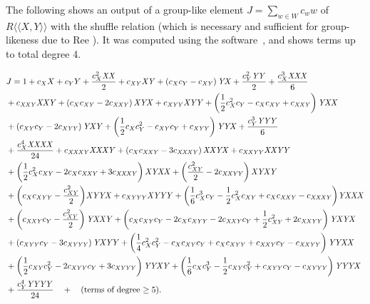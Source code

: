 \documentclass[ALCO,Unicode,published]{cedram}
\def\la{\langle}
\def\ra{\rangle}
\def\lala{\la\!\la}
\def\rara{\ra\!\ra}
\begin{document}
\begin{Example}
The following shows an output of a group-like element 
$J=\sum_{w\in W}c_w w$ of $R\lala X,Y\rara$ with the
shuffle relation (which is necessary and 
sufficient for group-likeness due to Ree \cite{Ree}). 
It was computed using the software~\cite{Maple}, and shows terms
up to total degree 4.

\footnotesize \begin{align*} 
\displaystyle &J=
1+c_{X} X +c_{Y} Y +\frac{c_{X}^{2} \mathit{XX}}{2}+c_{\mathit{XY}} \mathit{XY} +\left(c_{X} c_{Y}-c_{\mathit{XY}}\right) \mathit{YX} 
+\frac{c_{Y}^{2} \mathit{YY}}{2}+\frac{c_{X}^{3} \mathit{XXX}}{6} 
\\
&+c_{\mathit{XXY}} \mathit{XXY} +\left(c_{X} c_{\mathit{XY}}-2 c_{\mathit{XXY}}\right) \mathit{XYX} +c_{\mathit{XYY}} \mathit{XYY} +\left(\frac{1}{2} c_{X}^{2} c_{Y}-c_{X} c_{\mathit{XY}}+c_{\mathit{XXY}}\right) \mathit{YXX} 
\\
&+\left(c_{\mathit{XY}} c_{Y}-2 c_{\mathit{XYY}}\right) \mathit{YXY} 
+\left(\frac{1}{2} c_{X} c_{Y}^{2}-c_{\mathit{XY}} c_{Y}+c_{\mathit{XYY}}\right) \mathit{YYX} +\frac{c_{Y}^{3} \mathit{YYY}}{6}
\\
&+\frac{c_{X}^{4} \mathit{XXXX}}{24}+c_{\mathit{XXXY}} \mathit{XXXY} +\left(c_{X} c_{\mathit{XXY}}-3 c_{\mathit{XXXY}}\right) \mathit{XXYX} +c_{\mathit{XXYY}} \mathit{XXYY} 
\\
&+\left(\frac{1}{2} c_{X}^{2} c_{\mathit{XY}}-2 c_{X} c_{\mathit{XXY}}+3 c_{\mathit{XXXY}}\right) \mathit{XYXX} +\left(\frac{c_{\mathit{XY}}^{2}}{2}-2 c_{\mathit{XXYY}}\right) \mathit{XYXY} 
\\
&+\left(c_{X} c_{\mathit{XYY}}-\frac{c_{\mathit{XY}}^{2}}{2}\right) \hspace{-0.05cm} \mathit{XYYX} 
+c_{\mathit{XYYY}} \mathit{XYYY} +\left(\frac{1}{6} c_{X}^{3} c_{Y}-\frac{1}{2} c_{X}^{2} c_{\mathit{XY}}+c_{X} c_{\mathit{XXY}}-c_{\mathit{XXXY}}\right) \hspace{-0.05cm} \mathit{YXXX}
\\
&+\left(c_{\mathit{XXY}} c_{Y}-\frac{c_{\mathit{XY}}^{2}}{2}\right) \mathit{YXXY} 
+\left(c_{X} c_{\mathit{XY}} c_{Y}-2 c_{X} c_{\mathit{XYY}}-2 c_{\mathit{XXY}} c_{Y}+\frac{1}{2} c_{\mathit{XY}}^{2}+2 c_{\mathit{XXYY}}\right) \mathit{YXYX}
\\ 
&+\left(c_{\mathit{XYY}} c_{Y}-3 c_{\mathit{XYYY}}\right) \mathit{YXYY} 
+\left(\frac{1}{4} c_{X}^{2} c_{Y}^{2}-c_{X} c_{\mathit{XY}} c_{Y}+c_{X} c_{\mathit{XYY}}+c_{\mathit{XXY}} c_{Y}-c_{\mathit{XXYY}}\right) \mathit{YYXX} 
\\
&+\left(\frac{1}{2} c_{\mathit{XY}} c_{Y}^{2}-2 c_{\mathit{XYY}} c_{Y}+3 c_{\mathit{XYYY}}\right) \mathit{YYXY} 
+\left(\frac{1}{6} c_{X} c_{Y}^{3}-\frac{1}{2} c_{\mathit{XY}} c_{Y}^{2}+c_{\mathit{XYY}} c_{Y}-c_{\mathit{XYYY}}\right) \mathit{YYYX}
\\
&+\frac{c_{Y}^{4} \mathit{YYYY}}{24} 
\quad+\quad \textrm{(terms of degree $\ge 5$)}. 
\end{align*} \normalsize


\end{Example}
\end{document}
